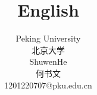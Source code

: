 \documentclass[12pt,twiside,a4paper]{ctexbook}
\numberwithin{chapter}{part}
\begin{document}

\author
{
Peking University\\
北京大学\\
ShuwenHe\\
何书文\\
1201220707@pku.edu.cn
}


\title{English}
\maketitle
\tableofcontents %
\newpage
\pagestyle{fancy}
\end{document}

